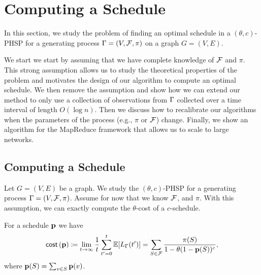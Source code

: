 \section{Computing a Schedule}\label{sec:method}
In this section, we study the problem of finding an optimal schedule in a
$(\theta,c)$-PHSP for a generating process $\Gamma = (V, \mathcal{F}, \pi)$ on a graph
$G=(V,E)$.

We start we start by assuming that we have complete knowledge of $\mathcal{F}$ and $\pi$.
This strong assumption allows us to study the theoretical properties of the
problem and motivates the design of our algorithm to compute an optimal
schedule. We then remove the assumption and show how we can extend our method
to only use a collection of observations from $\Gamma$ collected over a time
interval of length $O(\log n)$. Then we discuss how to recalibrate our
algorithms when the parameters of the process (e.g., $\pi$ or $\mathcal{F}$) change.
Finally, we show an algorithm for the MapReduce framework that allows us to
scale to large networks.

\subsection{Computing a Schedule}\label{sec:optimize}
Let $G=(V,E)$ be a graph. We study the $(\theta,c)$-PHSP for a generating
process $\Gamma=(V, \mathcal{F}, \pi)$. Assume for now that we know $\mathcal{F}$, and $\pi$. With
this assumption, we can exactly compute the $\theta$-cost of a $c$-schedule.

\begin{lemma}\label{lem:explicit}
For a schedule $\mathbf{p}$ we have
\begin{equation}\label{eq:explicit}
\mathsf{cost}\left( \mathbf{p} \right) \coloneqq
\lim_{t\rightarrow\infty}\frac{1}{t}\sum_{t'=0}^t\mathbb{E}[L_{\Gamma}(t')] = \sum_{S\in \mathcal{F}} \frac{\pi(S)}{1- \theta(1-\mathbf{p}(S))^c},
\end{equation}
where $\mathbf{p}(S) = \sum_{v\in S} \mathbf{p}(v)$.
\end{lemma}


